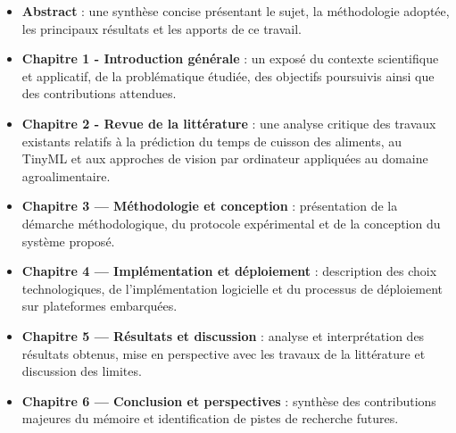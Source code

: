 \begin{itemize}
    \item \textbf{Abstract} : une synthèse concise présentant le sujet, la méthodologie adoptée, les principaux résultats et les apports de ce travail.  
    \item \textbf{Chapitre 1 - Introduction générale} : un exposé du contexte scientifique et applicatif, de la problématique étudiée, des objectifs poursuivis ainsi que des contributions attendues.  
    \item \textbf{Chapitre 2 - Revue de la littérature} : une analyse critique des travaux existants relatifs à la prédiction du temps de cuisson des aliments, au TinyML et aux approches de vision par ordinateur appliquées au domaine agroalimentaire.  
    \item \textbf{Chapitre 3 — Méthodologie et conception} : présentation de la démarche méthodologique, du protocole expérimental et de la conception du système proposé.  
    \item \textbf{Chapitre 4 — Implémentation et déploiement} : description des choix technologiques, de l’implémentation logicielle et du processus de déploiement sur plateformes embarquées.  
    \item \textbf{Chapitre 5 — Résultats et discussion} : analyse et interprétation des résultats obtenus, mise en perspective avec les travaux de la littérature et discussion des limites.  
    \item \textbf{Chapitre 6 — Conclusion et perspectives} : synthèse des contributions majeures du mémoire et identification de pistes de recherche futures.  
\end{itemize}
